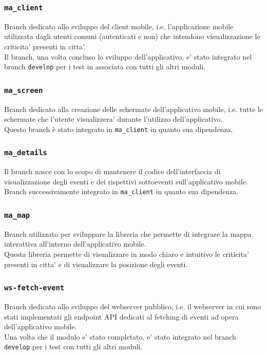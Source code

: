 \documentclass{article}
\begin{document}
\subsubsection{\texttt{ma\_client}}

Branch dedicato allo sviluppo del client mobile, i.e. l'applicazione mobile utilizzata dagli utenti comuni (autenticati e non) che intendono visualizzazione le criticita' presenti in citta'.\\
Il branch, una volta concluso lo sviluppo dell'applicativo, e' stato integrato nel branch \texttt{develop} per i test in associata con tutti gli altri moduli.


\subsubsection{\texttt{ma\_screen}}

Branch dedicato alla creazione delle schermate dell'applicativo mobile, i.e. tutte le schermate che l'utente visualizzera' durante l'utilizzo dell'applicativo.\\
Questo branch è stato integrato in \texttt{ma\_client} in quanto sua dipendenza.

\subsubsection{\texttt{ma\_details}}

Il branch nasce con lo scopo di mantenere il codice dell'interfaccia di visualizzazione degli eventi e dei rispettivi sottoeventi sull'applicativo mobile.
Branch successivamente integrato in \texttt{ma\_client} in quanto sua dipendenza.

\subsubsection{\texttt{ma\_map}}

Branch utilizzato per sviluppare la libreria che permette di integrare la mappa interattiva all'interno dell'applicativo mobile.\\
Questa libreria permette di visualizzare in modo chiaro e intuitivo le criticita' presenti in citta' e di visualizzare la posizione degli eventi.

\subsubsection{\texttt{ws-fetch-event}}

Branch dedicato allo sviluppo del webserver pubblico, i.e. il webserver in cui sono stati implementati gli endpoint API dedicati al fetching di eventi ad opera dell'applicativo mobile.\\
Una volta che il modulo e' stato completato, e' stato integrato nel branch \texttt{develop} per i test con tutti gli altri moduli.
\end{document}
